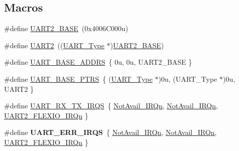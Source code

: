 \subsection*{Macros}
\begin{DoxyCompactItemize}
\item 
\#define \mbox{\hyperlink{group___u_a_r_t___peripheral___access___layer_gac9998d643534960b684d45a60b998421}{U\+A\+R\+T2\+\_\+\+B\+A\+SE}}~(0x4006\+C000u)
\item 
\#define \mbox{\hyperlink{group___u_a_r_t___peripheral___access___layer_ga7f6bd6eb89ae2eeae97af4207ebe3cde}{U\+A\+R\+T2}}~((\mbox{\hyperlink{struct_u_a_r_t___type}{U\+A\+R\+T\+\_\+\+Type}} $\ast$)\mbox{\hyperlink{group___u_a_r_t___peripheral___access___layer_gac9998d643534960b684d45a60b998421}{U\+A\+R\+T2\+\_\+\+B\+A\+SE}})
\item 
\#define \mbox{\hyperlink{group___u_a_r_t___peripheral___access___layer_gacc6561447356c229be264fa294e6cb79}{U\+A\+R\+T\+\_\+\+B\+A\+S\+E\+\_\+\+A\+D\+D\+RS}}~\{ 0u, 0u, U\+A\+R\+T2\+\_\+\+B\+A\+S\+E \}
\item 
\#define \mbox{\hyperlink{group___u_a_r_t___peripheral___access___layer_ga7b34a38b9492a1e1007b2f66383aef17}{U\+A\+R\+T\+\_\+\+B\+A\+S\+E\+\_\+\+P\+T\+RS}}~\{ (\mbox{\hyperlink{struct_u_a_r_t___type}{U\+A\+R\+T\+\_\+\+Type}} $\ast$)0u, (\+U\+A\+R\+T\+\_\+\+Type $\ast$)0u, U\+A\+R\+T2 \}
\item 
\#define \mbox{\hyperlink{group___u_a_r_t___peripheral___access___layer_ga84932f7830684ae87059a8343f90095b}{U\+A\+R\+T\+\_\+\+R\+X\+\_\+\+T\+X\+\_\+\+I\+R\+QS}}~\{ \mbox{\hyperlink{group___interrupt__vector__numbers_gga666eb0caeb12ec0e281415592ae89083a1f4ef0294648930fce11a95a3000197d}{Not\+Avail\+\_\+\+I\+R\+Qn}}, \mbox{\hyperlink{group___interrupt__vector__numbers_gga666eb0caeb12ec0e281415592ae89083a1f4ef0294648930fce11a95a3000197d}{Not\+Avail\+\_\+\+I\+R\+Qn}}, \mbox{\hyperlink{group___interrupt__vector__numbers_gga666eb0caeb12ec0e281415592ae89083a5475321bd2bac9aae86ed45895c66b1f}{U\+A\+R\+T2\+\_\+\+F\+L\+E\+X\+I\+O\+\_\+\+I\+R\+Qn}} \}
\item 
\mbox{\label{group___u_a_r_t___peripheral___access___layer_ga0f41ca62f0d44fb9c422d8cb59e4b73d}} 
\#define {\bfseries U\+A\+R\+T\+\_\+\+E\+R\+R\+\_\+\+I\+R\+QS}~\{ \mbox{\hyperlink{group___interrupt__vector__numbers_gga666eb0caeb12ec0e281415592ae89083a1f4ef0294648930fce11a95a3000197d}{Not\+Avail\+\_\+\+I\+R\+Qn}}, \mbox{\hyperlink{group___interrupt__vector__numbers_gga666eb0caeb12ec0e281415592ae89083a1f4ef0294648930fce11a95a3000197d}{Not\+Avail\+\_\+\+I\+R\+Qn}}, \mbox{\hyperlink{group___interrupt__vector__numbers_gga666eb0caeb12ec0e281415592ae89083a5475321bd2bac9aae86ed45895c66b1f}{U\+A\+R\+T2\+\_\+\+F\+L\+E\+X\+I\+O\+\_\+\+I\+R\+Qn}} \}
\end{DoxyCompactItemize}


